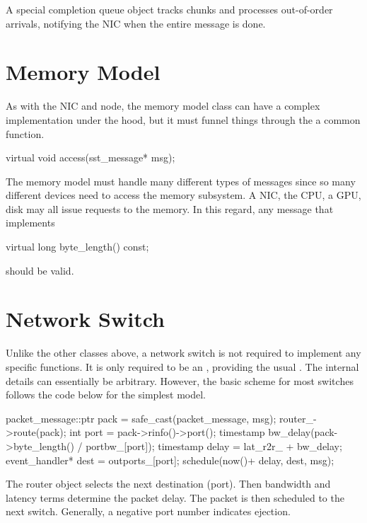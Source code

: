 A special completion queue object tracks chunks and processes out-of-order arrivals,
notifying the NIC when the entire message is done.

\section{Memory Model}\label{sec:memModel}
As with the NIC and node, the memory model class can have a complex implementation under the hood,
but it must funnel things through the a common function.

\begin{CppCode}
  virtual void
  access(sst_message* msg);
\end{CppCode}

The memory model must handle many different types of messages since so many different devices need to access the memory subsystem.
A NIC, the CPU, a GPU, disk may all issue requests to the memory.
In this regard, any message that implements

\begin{CppCode}
  virtual long
  byte_length() const;
\end{CppCode}
should be valid.

\section{Network Switch}\label{sec:networkSwitch}

Unlike the other classes above, a network switch is not required to implement any specific functions.
It is only required to be an , providing the usual .
The internal details can essentially be arbitrary.
However, the basic scheme for most switches follows the code below for the simplest  model.

\begin{CppCode}
  packet_message::ptr pack = safe_cast(packet_message, msg);
  router_->route(pack);
  int port = pack->rinfo()->port();
  timestamp bw_delay(pack->byte_length() / portbw_[port]);
  timestamp delay = lat_r2r_ + bw_delay;
  event_handler* dest = outports_[port];
  schedule(now()+ delay, dest, msg);
\end{CppCode}
The router object selects the next destination (port).
Then bandwidth and latency terms determine the packet delay.
The packet is then scheduled to the next switch.
Generally, a negative port number indicates ejection.

